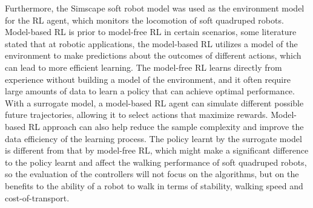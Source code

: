  Furthermore, the Simscape soft robot model was used as the environment model for the \ac{RL} agent\cite{jiSynthesizingOptimalGait2022}, which monitors the locomotion of soft quadruped robots. Model-based \ac{RL} is prior to model-free \ac{RL} in certain scenarios, some literature\cite{polydorosSurveyModelBasedReinforcement2017,wangBenchmarkingModelBasedReinforcement2019} stated that at robotic applications, the model-based \ac{RL} utilizes a model of the environment to make predictions about the outcomes of different actions, which can lead to more efficient learning. The model-free \ac{RL} learns directly from experience without building a model of the environment\cite{arulkumaranDeepReinforcementLearning2017}, and it often require large amounts of data to learn a policy that can achieve optimal performance\cite{calisirModelFreeReinforcementLearning2019}. With a surrogate model, a model-based \ac{RL} agent can simulate different possible future trajectories, allowing it to select actions that maximize rewards\cite{fazeliSeeFeelAct2019}. Model-based \ac{RL} approach can also help reduce the sample complexity and improve the data efficiency of the learning process\cite{atkesonComparisonDirectModelbased1997}. The policy learnt by the surrogate model is different from that by model-free \ac{RL}\cite{fazeliSeeFeelAct2019}, which might make a significant difference to the policy learnt and affect the walking performance of soft quadruped robots, so the evaluation of the controllers will not focus on the algorithms, but on the benefits to the ability of a robot to walk in terms of stability, walking speed and cost-of-transport.

